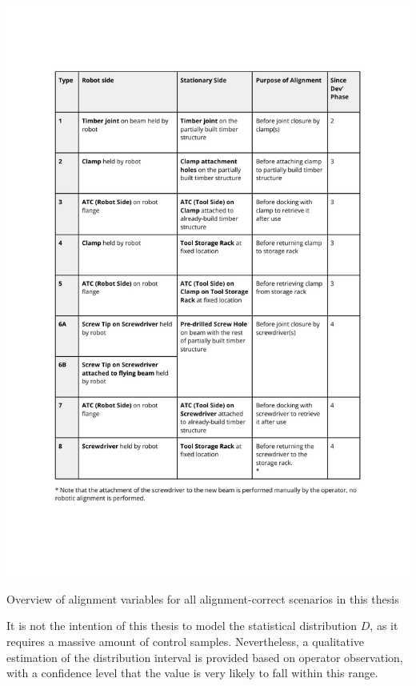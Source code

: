 \clearpage
\begin{table}[ht!]
    \includegraphics[page=7, trim=25.4mm 40mm 14mm 33mm, clip, width=\textwidth]{tables/Tables in Chapter 9 to 11.pdf}
    \caption{Overview of alignment variables for all alignment-correct scenarios in this thesis}
    \label{table:overview-of-alignment-variables-for-all-alignment}
\end{table}
\clearpage

It is not the intention of this thesis to model the statistical distribution $D$, as it requires a massive amount of control samples. Nevertheless, a qualitative estimation of the distribution interval is provided based on operator observation, with a confidence level that the value is very likely to fall within this range.

\FloatBarrier

